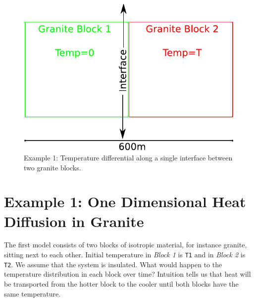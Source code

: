 
%
%
%

\begin{figure}[h!]
\centerline{\includegraphics[width=4.in]{figures/onedheatdiff001}}
\caption{Example 1: Temperature differential along a single interface between two granite blocks.}
\label{fig:onedgbmodel}
\end{figure}

\section{Example 1: One Dimensional Heat Diffusion in Granite}
\label{Sec:1DHDv00}

The first model consists of two blocks of isotropic material, for instance granite, sitting next to each other.
Initial temperature in \textit{Block 1} is \verb|T1| and in \textit{Block 2} is \verb|T2|.
We assume that the system is insulated.
What would happen to the temperature distribution in each block over time? 
Intuition tells us that heat will be transported from the hotter block to the cooler until both
blocks have the same temperature.

